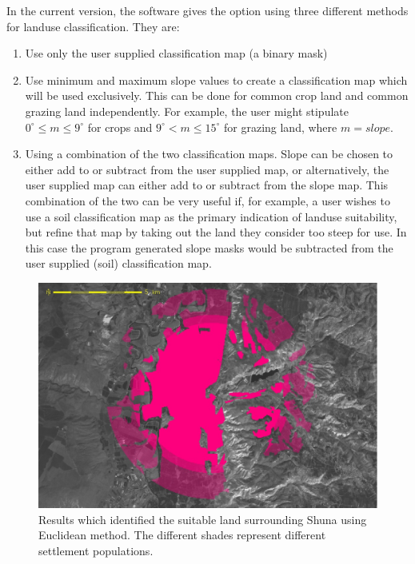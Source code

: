   In the current version, the software gives the option using three different
  methods for landuse classification.  They are: 
  \begin{enumerate} 
    \item  Use only the user supplied classification map (a binary mask) 
    \item  Use minimum and maximum slope values to create a classification map
      which will be used exclusively.  This can be done for common crop land and
      common grazing land independently.  For example, the user might stipulate
      $0^\circ \leq m \leq 9^\circ$ for crops and $9^\circ < m \leq 15^\circ$ for
      grazing land, where $m=slope$.  
    \item  Using a combination of the two classification maps.  Slope can be chosen
      to either add to or subtract from the user supplied map, or alternatively, the
      user supplied map can either add to or subtract from the slope map.  This
      combination of the two can be very useful if, for example, a user wishes to use
      a soil classification map as the primary indication of landuse suitability, but
      refine that map by taking out the land they consider too steep for use.  In
      this case the program generated slope masks would be subtracted from the user
      supplied (soil) classification map.  
  \end{enumerate}
  
\begin{figure}[htbp] %
  \includegraphics[scale=0.225]{./images/landcatchment.jpg}
  \caption{\label{fig:landCatchment}Results which identified the suitable land
    surrounding Shuna using Euclidean method. The different shades represent different
    settlement populations.}
\end{figure}

